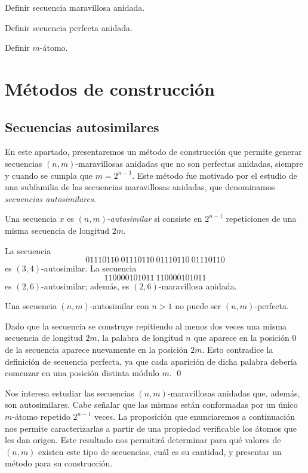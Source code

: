 \documentclass[11pt]{article}
\begin{document}
Definir secuencia maravillosa anidada.

Definir secuencia perfecta anidada.

Definir $m$-átomo.

\section{Métodos de construcción}

\subsection{Secuencias autosimilares}

En este apartado, presentaremos un método de construcción que permite generar
secuencias $(n,m)$-maravillosas anidadas que no son perfectas anidadas, siempre
y cuando se cumpla que $m = 2^{n - 1}$.
Este método fue motivado por el estudio de una subfamilia de las secuencias
maravillosas anidadas, que denominamos \emph{secuencias autosimilares}.

\begin{defi}
	Una secuencia $x$ es $(n,m)$-\emph{autosimilar} si consiste en $2^{n-1}$
	repeticiones de una misma secuencia de longitud $2m$.
\end{defi}

\begin{example}
	La secuencia \[ 01110110\ 01110110\ 01110110\ 01110110 \] es
	$(3,4)$-autosimilar.
	La secuencia \[ 110000101011 \ 110000101011 \] es $(2,6)$-autosimilar; además,
	es $(2,6)$-maravillosa anidada.
\end{example}

\begin{prop} \label{lemma:autosimilar-cannot-be-np}
	Una secuencia $(n,m)$-autosimilar con $n > 1$ no puede ser $(n,m)$-perfecta.
\end{prop}

\begin{demo}
	Dado que la secuencia se construye repitiendo al menos dos veces una misma
	secuencia de longitud $2m$, la palabra de longitud $n$ que aparece en la
	posición $0$ de la secuencia aparece nuevamente en la posición $2m$.
	Esto contradice la definición de secuencia perfecta, ya que cada aparición de
	dicha palabra debería comenzar en una posición distinta módulo $m$.
	\qed
\end{demo}

Nos interesa estudiar las secuencias $(n,m)$-maravillosas anidadas que, además,
son autosimilares.
Cabe señalar que las mismas están conformadas por un único $m$-átomo repetido
$2^{n-1}$ veces.
La proposición que enunciaremos a continuación nos permite caracterizarlas a
partir de una propiedad verificable los átomos que les dan origen.
Este resultado nos permitirá determinar para qué valores de $(n,m)$ existen
este tipo de secuencias, cuál es su cantidad, y presentar un método para su
construcción.
\end{document}
